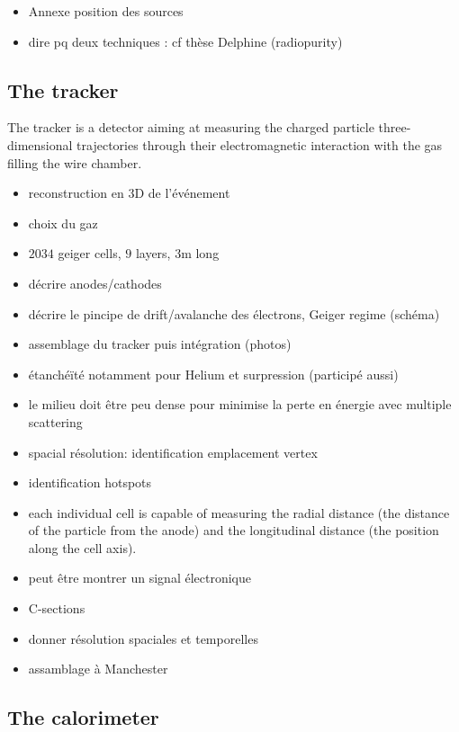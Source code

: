 \begin{itemize}
\item Annexe position des sources
\item dire pq deux techniques : cf thèse Delphine (radiopurity)
\end{itemize}

\subsection{The tracker}

The tracker is a detector aiming at measuring the charged particle three-dimensional trajectories through their electromagnetic interaction with the gas filling the wire chamber.


\begin{itemize}
\item reconstruction en 3D de l'événement
\item choix du gaz
\item $2034$ geiger cells, $9$ layers, $3$m long
\item décrire anodes/cathodes
\item décrire le pincipe de drift/avalanche des électrons, Geiger regime (schéma)
\item assemblage du tracker puis intégration (photos)
\item étanchéïté notamment pour Helium et surpression (participé aussi)
\item le milieu doit être peu dense pour minimise la perte en énergie avec multiple scattering
\item spacial résolution: identification emplacement vertex
\item identification hotspots
\item each individual cell is capable of measuring the radial distance (the distance of the particle from the anode) and the longitudinal distance (the position along the cell axis).
\item peut être montrer un signal électronique
\item C-sections
\item donner résolution spaciales et temporelles
\item assamblage à Manchester
\end{itemize}

\subsection{The calorimeter}
\label{subsec:SN_calo}

